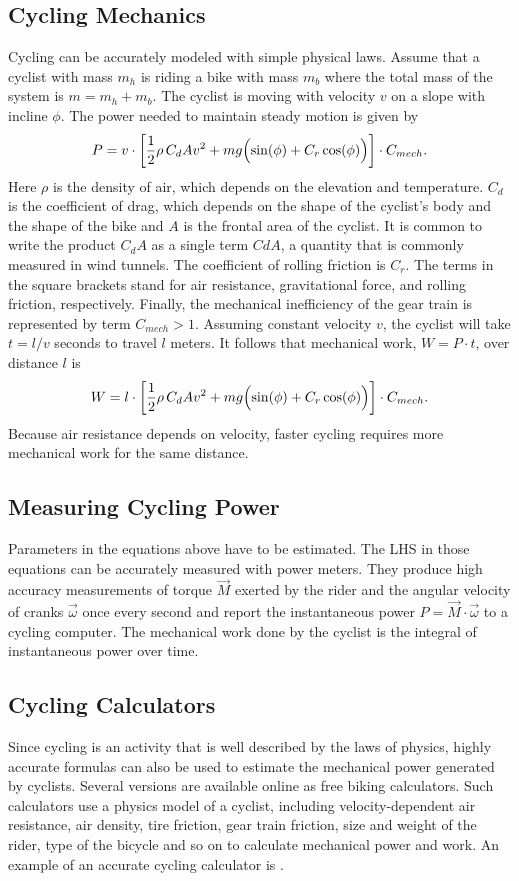 \documentclass{article}[12pt,letterpaper]
\begin{document}
\subsection{Cycling Mechanics}
Cycling can be accurately modeled with simple physical laws. Assume that a cyclist with mass $m_h$ is riding a bike with mass $m_b$ where the total mass of the system is $m=m_h + m_b$. The cyclist is moving with velocity $v$ on a slope with incline $\phi$. The power needed to maintain steady motion is given by
\begin{equation}
\label{eq:bike_power}
  P =  v \cdot \left[{1 \over 2} \rho \,C_d A v^2 + m g \Bigl( \sin(\phi) + C_r \cos(\phi)\Bigr) \right] \cdot C_{mech}.
\end{equation}
Here $\rho$ is the density of air, which depends on the elevation and temperature. $C_d$ is the coefficient of drag, which depends on the shape of the cyclist's body and the shape of the bike and $A$ is the frontal area of the cyclist. It is common to write the product $C_d A$ as a single term $CdA$, a quantity that is commonly measured in wind tunnels. The coefficient of rolling friction is $C_r$.
The terms in the square brackets stand for air resistance, gravitational force, and rolling friction, respectively. Finally, the mechanical inefficiency of the gear train is represented by term $C_{mech} > 1$.
Assuming constant velocity $v$, the cyclist will take $t=l/v$ seconds to travel $l$ meters. It follows that mechanical work, $W=P \cdot t$, over distance $l$ is
\begin{equation}
\label{eq:bike_work}
W =  l \cdot \left[{1 \over 2} \rho \,C_d A v^2 + m g \Bigl( \sin(\phi) + C_r \cos(\phi)\Bigr) \right] \cdot C_{mech}.
\end{equation}
Because air resistance depends on velocity, faster cycling requires more mechanical work for the same distance.
\subsection{Measuring Cycling Power}
Parameters in the equations above have to be estimated. The LHS in those equations can be accurately measured with power meters. They produce high accuracy measurements of torque $\vec{M}$ exerted by the rider and the angular velocity of cranks $\vec{\omega}$ once every second and report the instantaneous power $P=\vec{M}\cdot\vec{\omega}$ to a cycling computer. The mechanical work done by the cyclist is the integral of instantaneous power over time.
\subsection{Cycling Calculators}
Since cycling is an activity that is well described by the laws of physics, highly accurate formulas can also be used to estimate the mechanical power generated by cyclists. Several versions are available online as free biking calculators. Such calculators use a physics model of a cyclist, including velocity-dependent air resistance, air density, tire friction, gear train friction, size and weight of the rider, type of the bicycle and so on to calculate mechanical power and work. An example of an accurate cycling calculator is \cite{bike-calculator}.
\end{document}
